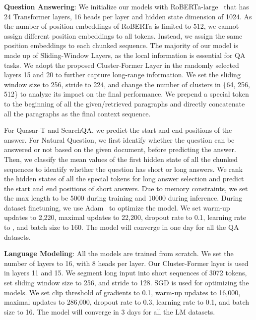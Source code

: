 \documentclass[11pt,a4paper]{article}
\begin{document}
\vspace{5pt}
\noindent \textbf{Question Answering}: We initialize our models with RoBERTa-large~\cite{roberta} that has 24 Transformer layers, 16 heads per layer and hidden state dimension of 1024.
As the number of position embeddings of RoBERTa is limited to 512, we cannot assign different position embeddings to all tokens.
Instead, we assign the same position embeddings to each chunked sequence.
The majority of our model is made up of Sliding-Window Layers, as the local information is essential for QA tasks. We adopt the proposed Cluster-Former Layer in the randomly selected layers 15 and 20 to further capture long-range information.
We set the sliding window size  to 256, stride  to 224, and change the number of clusters in \{64, 256, 512\} to analyze its impact on the final performance.
We prepend a special token to the beginning of all the given/retrieved paragraphs and directly concatenate all the paragraphs as the final context sequence.

For Quasar-T and SearchQA, we predict the start and end positions of the answer.
For Natural Question, we first identify whether the question can be answered or not based on the given document, before predicting the answer.
Then, we classify the mean values of the first hidden state of all the chunked sequences to identify whether the question has short or long answers. 
We rank the hidden states of all the special tokens for long answer selection and predict the start and end positions of short answers.
Due to memory constraints, we set the max length to be 5000 during training and 10000 during inference.
During dataset finetuning, we use Adam~\cite{kingma2014adam} to optimize the model. We set warm-up updates to 2,220, maximal updates to 22,200, dropout rate to 0.1, learning rate to , and batch size to 160.
The model will converge in one day for all the QA datasets.

\vspace{5pt}
\noindent \textbf{Language Modeling}: All the models are trained from scratch.
We set the number of layers to 16, with 8 heads per layer.
Our Cluster-Former layer is used in layers 11 and 15. 
We segment long input into short sequences of 3072 tokens, set sliding window size  to 256, and stride  to 128.
SGD is used for optimizing the models.
We set clip threshold of gradients to 0.1, warm-up updates to 16,000, maximal updates to 286,000, dropout rate to 0.3, learning rate to 0.1, and batch size to 16.
The model will converge in 3 days for all the LM datasets.
\end{document}
